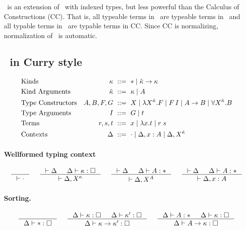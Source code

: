 \section{\Fi}
\Fi\ is an extension of \Fw\ with indexed types, but less powerful than
the Calculus of Constructions (CC). That is, all typeable terms in \Fi\ are
typeable terms in \Fi\ and all typable terms in \Fi\ are typable terms in CC.
Since CC is normalizing, normalization of \Fi\ is automatic.

\subsection{\Fi\ in Curry style}

\begin{align*}
&\text{Kinds}
 	& \kappa		&~ ::= ~ *
				\mid {\check\kappa} \to \kappa
\\
&\text{Kind Arguments}
 	& {\check\kappa}		&~ ::= ~ \kappa \mid A
\\
&\text{Type Constructors}
	& A,B,F,G		&~ ::= ~ X
				\mid \lambda X^{\check\kappa}.F
				\mid F\,I
				\mid A\to B
				\mid \forall X^{\check\kappa} . B
\\
&\text{Type Arguments}
	& I			&~ ::= ~ G \mid t
\\
&\text{Terms}
	& r,s,t			&~ ::= ~ x \mid \lambda x.t \mid r\;s
\\
&\text{Contexts}
	& \Delta		&~ ::= ~ \cdot
				\mid \Delta, x : A
				\mid \Delta, X^{\check\kappa}
\end{align*}

\paragraph{Wellformed typing context}
\[ \inference{}{|- \cdot}
 ~~~~
   \inference{|- \Delta & \Delta |- \kappa:\square}{|- \Delta,X^\kappa}
 ~~~~
   \inference{|- \Delta & \Delta |- A:*}{|- \Delta,X^A}
 ~~~~
   \inference{|- \Delta & \Delta |- A:*}{|- \Delta,x:A}
\]

\paragraph{Sorting.}
\[ \inference{}{\Delta |- *:\square}
 ~~~~
   \inference{\Delta |- \kappa:\square & \Delta |- \kappa':\square}
             {\Delta |- \kappa \to \kappa' : \square}
 ~~~~
   \inference{\Delta |- A:* & \Delta |- \kappa:\square}
             {\Delta |- A \to \kappa : \square}
\]
